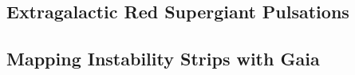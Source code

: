 {\color{green}
\subsection{Extragalactic Red Supergiant Pulsations}
}
{\color{brown}
\subsection{Mapping Instability Strips with Gaia}
}